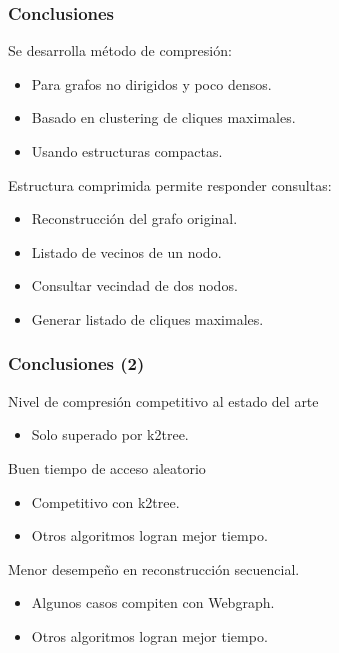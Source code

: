 \begin{frame}
\frametitle{Conclusiones}

Se desarrolla método de compresión:
\begin{itemize}
	\item Para grafos no dirigidos y poco densos.
	\item Basado en clustering de cliques maximales.
	\item Usando estructuras compactas.
\end{itemize}

Estructura comprimida permite responder consultas:
\begin{itemize}
	\item Reconstrucción del grafo original.
	\item Listado de vecinos de un nodo.
	\item Consultar vecindad de dos nodos.
	\item Generar listado de cliques maximales.
\end{itemize}

\end{frame}


\begin{frame}
\frametitle{Conclusiones (2)}

Nivel de compresión competitivo al estado del arte
\begin{itemize}
	\item Solo superado por k2tree.
\end{itemize}

Buen tiempo de acceso aleatorio
\begin{itemize}
	\item Competitivo con k2tree.
	\item Otros algoritmos logran mejor tiempo.
\end{itemize}

Menor desempeño en reconstrucción secuencial.
\begin{itemize}
	\item Algunos casos compiten con Webgraph.
	\item Otros algoritmos logran mejor tiempo.
\end{itemize}


\end{frame}


